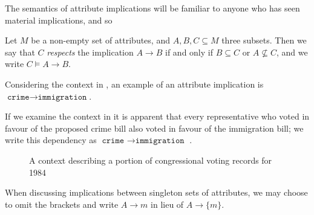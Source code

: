 The semantics of attribute implications will be familiar to anyone who has seen material implications, and so
\begin{definition}
  \label{definition:attribute-implication-semantics} Let $M$ be a non-empty set of attributes, and $A,B,C \subseteq M$ three subsets. Then we
  say that $C$ \emph{respects} the implication $A \rightarrow B$ if and only if $B \subseteq C$ or $A \not \subseteq C$, and we write $C \vDash
  A \rightarrow B$.
\end{definition}

Considering the context in , an example of an attribute implication is $\texttt{crime}\rightarrow \texttt{immigration
}$.

If we examine the context in  it is apparent that every representative who voted in favour of the proposed crime
bill also voted in favour of the immigration bill; we write this dependency as $\texttt{crime }\rightarrow \texttt{immigration }$.

\begin{figure}[H]
  \centering
  \begin{cxt}
    \label{cxt:voting}    
        
      
  \end{cxt}
  \caption{A context describing a portion of congressional voting records for 1984}
  \label{figure:voting-records}
\end{figure}

When discussing implications between singleton sets of attributes, we may choose to omit the brackets and write $A \rightarrow m$ in lieu of
$A \rightarrow \{m\}$.


